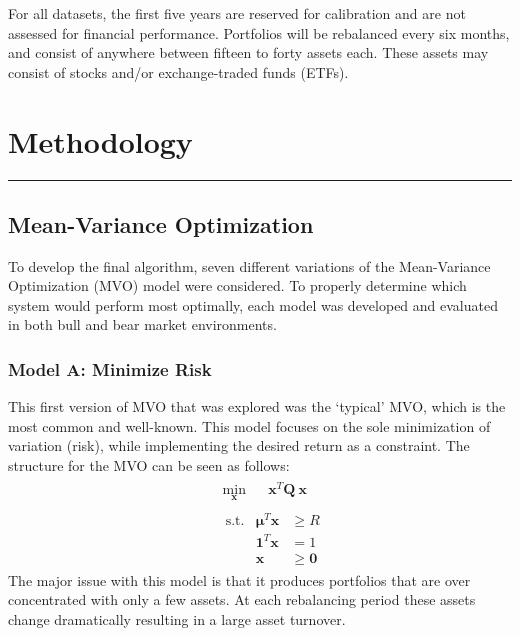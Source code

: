 \documentclass[10pt]{article}
\begin{document}
For all datasets, the first five years are reserved for calibration and are not assessed for financial performance. Portfolios will be rebalanced every six months, and consist of anywhere between fifteen to forty assets each. These assets may consist of stocks and/or exchange-traded funds (ETFs).
\pagebreak
\section{Methodology}
\hrule \vspace{15pt}

\subsection{Mean-Variance Optimization}
To develop the final algorithm, seven different variations of the Mean-Variance Optimization (MVO) model were considered. To properly determine which system would perform most optimally, each model was developed and evaluated in both bull and bear market environments. 
\subsubsection{Model A: Minimize Risk}
\label{sec:modelA}
This first version of MVO that was explored was the ‘typical’ MVO, which is the most common and well-known. This model focuses on the sole minimization of variation (risk), while implementing the desired return as a constraint. The structure for the MVO can be seen as follows: 
\[
\begin{aligned}
&\begin{aligned}
    & \min_{\bm{x}}     && \bm{x}^T \bm{Q}\ \bm{x}
\end{aligned} \\
&\begin{aligned}
    &\ \mathrm{s.t.}    & \bm{\mu}^T \bm{x} &\geq R \\
    &                   & \bm{1}^T \bm{x} &= 1 \\
    &                   & \bm{x} &\geq \bm{0}
\end{aligned}
\end{aligned}
\]
The major issue with this model is that it produces portfolios that are over concentrated with only a few assets. At each rebalancing period these assets change dramatically resulting in a large asset turnover. 
\end{document}
